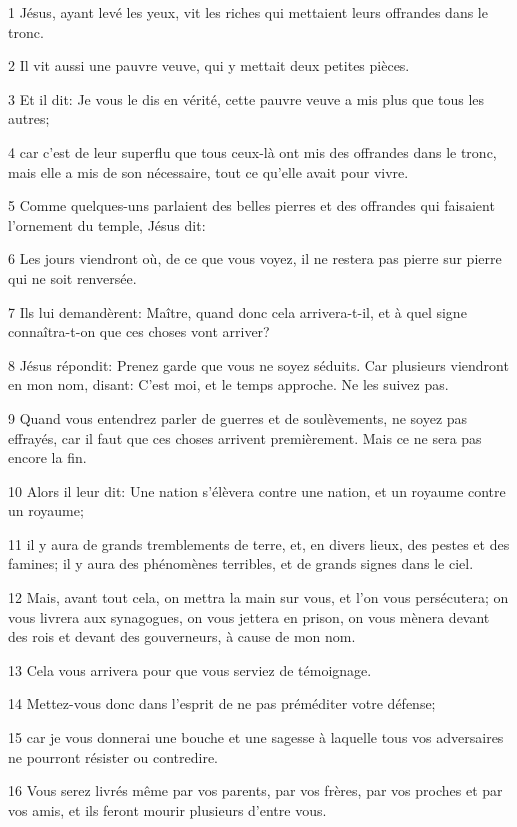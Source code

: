 \par 1 Jésus, ayant levé les yeux, vit les riches qui mettaient leurs offrandes dans le tronc.
\par 2 Il vit aussi une pauvre veuve, qui y mettait deux petites pièces.
\par 3 Et il dit: Je vous le dis en vérité, cette pauvre veuve a mis plus que tous les autres;
\par 4 car c'est de leur superflu que tous ceux-là ont mis des offrandes dans le tronc, mais elle a mis de son nécessaire, tout ce qu'elle avait pour vivre.
\par 5 Comme quelques-uns parlaient des belles pierres et des offrandes qui faisaient l'ornement du temple, Jésus dit:
\par 6 Les jours viendront où, de ce que vous voyez, il ne restera pas pierre sur pierre qui ne soit renversée.
\par 7 Ils lui demandèrent: Maître, quand donc cela arrivera-t-il, et à quel signe connaîtra-t-on que ces choses vont arriver?
\par 8 Jésus répondit: Prenez garde que vous ne soyez séduits. Car plusieurs viendront en mon nom, disant: C'est moi, et le temps approche. Ne les suivez pas.
\par 9 Quand vous entendrez parler de guerres et de soulèvements, ne soyez pas effrayés, car il faut que ces choses arrivent premièrement. Mais ce ne sera pas encore la fin.
\par 10 Alors il leur dit: Une nation s'élèvera contre une nation, et un royaume contre un royaume;
\par 11 il y aura de grands tremblements de terre, et, en divers lieux, des pestes et des famines; il y aura des phénomènes terribles, et de grands signes dans le ciel.
\par 12 Mais, avant tout cela, on mettra la main sur vous, et l'on vous persécutera; on vous livrera aux synagogues, on vous jettera en prison, on vous mènera devant des rois et devant des gouverneurs, à cause de mon nom.
\par 13 Cela vous arrivera pour que vous serviez de témoignage.
\par 14 Mettez-vous donc dans l'esprit de ne pas préméditer votre défense;
\par 15 car je vous donnerai une bouche et une sagesse à laquelle tous vos adversaires ne pourront résister ou contredire.
\par 16 Vous serez livrés même par vos parents, par vos frères, par vos proches et par vos amis, et ils feront mourir plusieurs d'entre vous.
